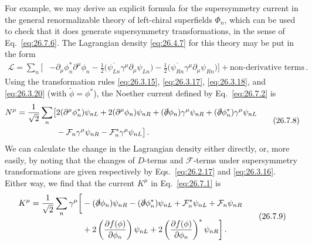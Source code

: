 For example, we may derive an explicit formula for the supersymmetry current
in the general renormalizable theory of left-chiral superfields \(\Phi_n\),
which can be used to check that it does generate supersymmetry
transformations, in the sense of Eq.~\eqref{eq:26.7.6}. The Lagrangian
density \eqref{eq:26.4.7} for this theory may be put in the form
\begin{equation}
  \begin{aligned}
  \mathcal{L}
  =\sum_n\biggl[
   &-\partial_\mu\phi_n^*\partial^\mu\phi_n
   -\frac12\bigl(\overline{\psi_{Ln}}\gamma^\mu
                  \partial_\mu\psi_{Ln}\bigr)
   -\frac12\bigl(\overline{\psi_{Rn}}\gamma^\mu
                  \partial_\mu\psi_{Rn}\bigr)
  \biggr]
  +\text{non-derivative terms}\,.
  \end{aligned}
  \tag{26.7.7}\label{eq:26.7.7}
\end{equation}
Using the transformation rules \eqref{eq:26.3.15}, \eqref{eq:26.3.17},
\eqref{eq:26.3.18}, and \eqref{eq:26.3.20} (with
\(\widetilde{\phi}=\phi^*\)), the Noether current defined by
Eq.~\eqref{eq:26.7.2} is
\begin{equation}
  \begin{aligned}
  N^\mu=\frac{1}{\sqrt{2}}\sum_n\bigl[
   &2(\partial^\mu\phi_n^*)\psi_{nL}
    +2(\partial^\mu\phi_n)\psi_{nR}
    +(\sl{\partial}\phi_n)\gamma^\mu\psi_{nR}
    +(\sl{\partial}\phi_n^*)\gamma^\mu\psi_{nL}
  \\
   &-\mathcal{F}_n\gamma^\mu\psi_{nR}
    -\mathcal{F}_n^*\gamma^\mu\psi_{nL}
  \bigr]\,.
  \end{aligned}
  \tag{26.7.8}\label{eq:26.7.8}
\end{equation}
We can calculate the change in the Lagrangian density either directly, or,
more easily, by noting that the changes of \(D\)-terms and
\(\mathcal{F}\)-terms under supersymmetry transformations are given
respectively by Eqs.~\eqref{eq:26.2.17} and \eqref{eq:26.3.16}. Either way,
we find that the current \(K^\mu\) in Eq.~\eqref{eq:26.7.1} is
\begin{equation}
  \begin{aligned}
  K^\mu=\frac{1}{\sqrt{2}}\sum_n\gamma^\mu\biggl[
   &-(\sl{\partial}\phi_n)\psi_{nR}
    -(\sl{\partial}\phi_n^*)\psi_{nL}
    +\mathcal{F}_n^*\psi_{nL}
    +\mathcal{F}_n\psi_{nR}
  \\
   &+2\left(\frac{\partial f(\phi)}{\partial\phi_n}\right)\psi_{nL}
    +2\left(\frac{\partial f(\phi)}{\partial\phi_n}\right)^*\psi_{nR}
  \biggr]\,.
  \end{aligned}
  \tag{26.7.9}\label{eq:26.7.9}
\end{equation}
